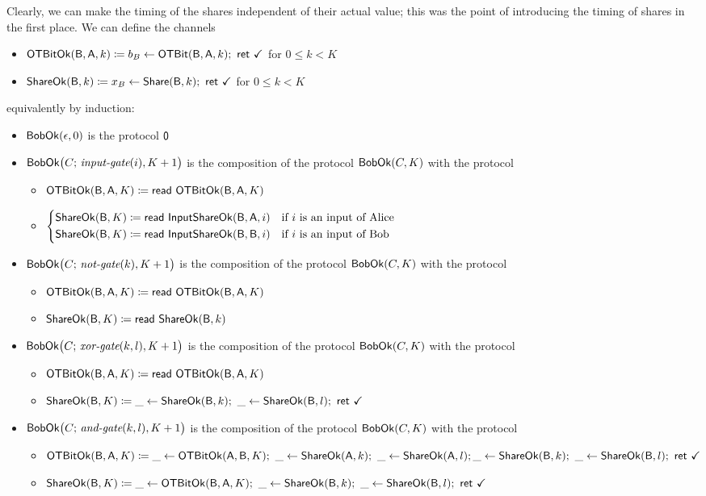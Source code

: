 \noindent Clearly, we can make the timing of the shares independent of their actual value; this was the point of introducing the timing of shares in the first place. We can define the channels
\begin{itemize}
\item $\mathsf{OTBitOk}(\mathsf{B},\mathsf{A},k) \coloneqq b_B \leftarrow \mathsf{OTBit}(\mathsf{B},\mathsf{A},k); \ \mathsf{ret} \ \checkmark$ for $0 \leq k < K$
\item $\mathsf{ShareOk}(\mathsf{B},k) \coloneqq x_B \leftarrow \mathsf{Share}(\mathsf{B},k); \ \mathsf{ret} \ \checkmark$ for $0 \leq k < K$
\end{itemize}
equivalently by induction:

\begin{itemize}
\item $\mathsf{BobOk}(\epsilon,0)$ is the protocol $\mathsf{0}$
\item $\mathsf{BobOk}\big(C; \, \textit{input-gate}(i),K+1\big)$ is the composition of the protocol $\mathsf{BobOk}(C,K)$ with the protocol
\begin{itemize}
\item $\mathsf{OTBitOk}(\mathsf{B},\mathsf{A},K) \coloneqq \mathsf{read} \ \mathsf{OTBitOk}(\mathsf{B},\mathsf{A},K)$
\item $\begin{cases*} \ShareOk(\B,K) \coloneqq \read{\InputShareOk(\B,\A,i)} & \text{if $i$ is an input of Alice} \\ \ShareOk(\B,K) \coloneqq \read{\InputShareOk(\B,\B,i)} & \text{if $i$ is an input of Bob} \end{cases*}$
\end{itemize}
\item $\mathsf{BobOk}\big(C; \, \textit{not-gate}(k),K+1\big)$ is the composition of the protocol $\mathsf{BobOk}(C,K)$ with the protocol
\begin{itemize}
\item $\mathsf{OTBitOk}(\mathsf{B},\mathsf{A},K) \coloneqq \mathsf{read} \ \mathsf{OTBitOk}(\mathsf{B},\mathsf{A},K)$
\item $\mathsf{ShareOk}(\mathsf{B},K) \coloneqq \mathsf{read} \ \mathsf{ShareOk}(\mathsf{B},k)$
\end{itemize}
\item $\mathsf{BobOk}\big(C; \, \textit{xor-gate}(k,l),K+1\big)$ is the composition of the protocol $\mathsf{BobOk}(C,K)$ with the protocol
\begin{itemize}
\item $\mathsf{OTBitOk}(\mathsf{B},\mathsf{A},K) \coloneqq \mathsf{read} \ \mathsf{OTBitOk}(\mathsf{B},\mathsf{A},K)$
\item $\ShareOk(\B,K) \coloneqq \_ \leftarrow \ShareOk(\B,k); \ \_ \leftarrow \ShareOk(\B,l); \ \ret{\checkmark}$
\end{itemize}
\item $\mathsf{BobOk}\big(C; \, \textit{and-gate}(k,l),K+1\big)$ is the composition of the protocol $\mathsf{BobOk}(C,K)$ with the protocol
\begin{itemize}
\item $\mathsf{OTBitOk}(\mathsf{B},\mathsf{A},K) \coloneqq \_ \leftarrow \mathsf{OTBitOk}(\mathsf{A},\mathsf{B},K); \ \_ \leftarrow \mathsf{ShareOk}(\mathsf{A},k); \ \_ \leftarrow \mathsf{ShareOk}(\mathsf{A},l); \\ \_ \leftarrow \mathsf{ShareOk}(\mathsf{B},k); \ \_ \leftarrow \mathsf{ShareOk}(\mathsf{B},l); \ \mathsf{ret} \ \checkmark$
\item $\mathsf{ShareOk}(\mathsf{B},K) \coloneqq \_ \leftarrow \mathsf{OTBitOk}(\mathsf{B},\mathsf{A},K); \ \_ \leftarrow \mathsf{ShareOk}(\mathsf{B},k); \ \_ \leftarrow \mathsf{ShareOk}(\mathsf{B},l); \ \mathsf{ret} \ \checkmark$
\end{itemize}
\end{itemize}

